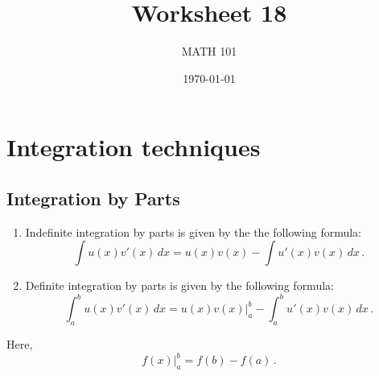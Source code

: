 \documentclass[12pt]{amsart}
\title{ Worksheet 18}
\author{MATH 101}
\date{\today}
\begin{document}
\maketitle

\section*{Integration techniques}

\subsection*{Integration by Parts}

\begin{enumerate}
	\item Indefinite integration by parts is given by the the following formula:
	      \begin{equation*}
		      \int u(x)v'(x) \, dx = u(x)v(x) - \int u'(x) v(x) \, dx \,.
	      \end{equation*}

	\item Definite integration by parts is given by the following formula:
	      \begin{equation*}
		      \int_a^b u(x)v'(x) \, dx = u(x)v(x)\big\rvert_a^b  - \int_a^b u'(x) v(x) \, dx \,.
	      \end{equation*}
\end{enumerate}
Here,
\begin{equation*}
	f(x) \big\rvert_a^b = f(b) - f(a) \,.
\end{equation*}
\end{document}
